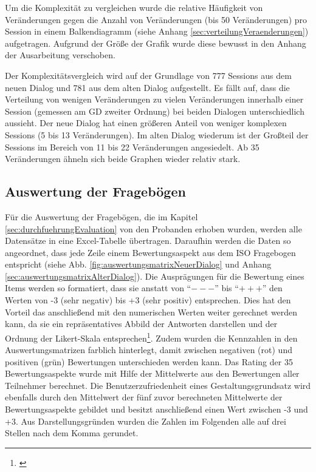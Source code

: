 Um die Komplexität zu vergleichen wurde die relative Häufigkeit von Veränderungen gegen die Anzahl von Veränderungen (bis 50 Veränderungen) pro Session in einem Balkendiagramm (siehe Anhang \ref{sec:verteilungVeraenderungen}) aufgetragen. Aufgrund der Größe der Grafik wurde diese bewusst in den Anhang der Ausarbeitung verschoben. 

Der Komplexitätsvergleich wird auf der Grundlage von 777 Sessions aus dem neuen Dialog und 781 aus dem alten Dialog aufgestellt. Es fällt auf, dass die Verteilung von wenigen Veränderungen zu vielen Veränderungen innerhalb einer Session (gemessen am GD zweiter Ordnung) bei beiden Dialogen unterschiedlich aussieht. Der neue Dialog hat einen größeren Anteil von weniger komplexen Sessions (5 bis 13 Veränderungen). Im alten Dialog wiederum ist der Großteil der Sessions im Bereich von 11 bis 22 Veränderungen angesiedelt. Ab 35 Veränderungen ähneln sich beide Graphen wieder relativ stark. 


\subsection{Auswertung der Fragebögen}
\label{sec:auswertungDerFrageboegen}
Für die Auswertung der Fragebögen, die im Kapitel \ref{sec:durchfuehrungEvaluation} von den Probanden erhoben wurden, werden alle Datensätze in eine Excel-Tabelle übertragen. Daraufhin werden die Daten so angeordnet, dass jede Zeile einem Bewertungsaspekt aus dem ISO Fragebogen entspricht (siehe Abb. \ref{fig:auswertungsmatrixNeuerDialog} und Anhang \ref{sec:auswertungsmatrixAlterDialog}). Die Ausprägungen für die Bewertung eines Items werden so formatiert, dass sie anstatt von \enquote{$---$} bis \enquote{$+++$} den Werten von -3 (sehr negativ) bis +3 (sehr positiv) entsprechen. Dies hat den Vorteil das anschließend mit den numerischen Werten weiter gerechnet werden kann, da sie ein repräsentatives Abbild der Antworten darstellen und der Ordnung der Likert-Skala entsprechen\footnote{\cite[vgl.][]{Statista}}. Zudem wurden die Kennzahlen in den Auswertungsmatrizen farblich hinterlegt, damit zwischen negativen (rot) und positiven (grün) Bewertungen unterschieden werden kann. Das Rating der 35 Bewertungsaspekte wurde mit Hilfe der Mittelwerte aus den Bewertungen aller Teilnehmer berechnet. Die Benutzerzufriedenheit eines Gestaltungsgrundsatz wird ebenfalls durch den Mittelwert der fünf zuvor berechneten Mittelwerte der Bewertungsaspekte gebildet und besitzt anschließend einen Wert zwischen -3 und +3. Aus Darstellungsgründen wurden die Zahlen im Folgenden alle auf drei Stellen nach dem Komma gerundet.

